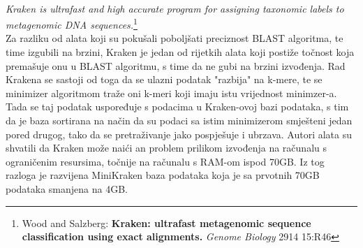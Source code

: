 \documentclass[times, utf8, zavrsni]{fer}
\begin{document}
\\{\textit{Kraken is ultrafast and high accurate program for assigning taxonomic labels to metagenomic DNA sequences.}\footnote[1]{Wood and Salzberg: \textbf{Kraken: ultrafast metagenomic sequence classification using exact alignments.} \textit{Genome Biology} 2914 15:R46}
\\Za razliku od alata koji su pokušali poboljšati preciznost BLAST algoritma, te time izgubili na brzini, Kraken je jedan od rijetkih alata koji postiže točnost koja premašuje onu u BLAST algoritmu, s time da ne gubi na brzini izvođenja. Rad Krakena se sastoji od toga da se ulazni podatak "razbija" na k-mere, te se minimizer algoritmom traže oni k-meri koji imaju istu vrijednost minimzer-a. Tada se taj podatak uspoređuje s podacima u Kraken-ovoj bazi podataka, s tim da je baza sortirana na način da su podaci sa istim minimizerom smješteni jedan pored drugog, tako da se pretraživanje jako pospješuje i ubrzava. Autori alata su shvatili da Kraken može naići an problem prilikom izvođenja na računalu s ograničenim resursima, točnije na računalu s RAM-om ispod 70GB. Iz tog razloga je razvijena MiniKraken baza podataka koja je sa prvotnih 70GB podataka smanjena na 4GB.
\begin{table}[htb]
	\centering
\end{table}}
\end{document}
